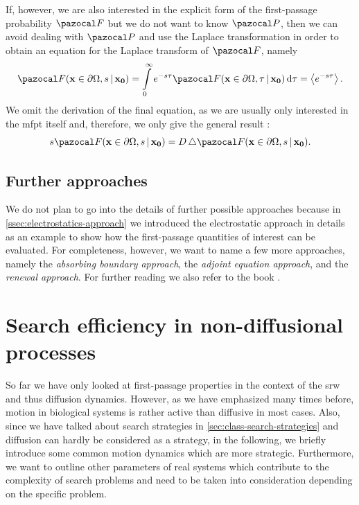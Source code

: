 \noindent If, however, we are also interested in the explicit form of the first-passage probability $\F$ but we do not want to know $\P$, then we can avoid dealing with $\P$ and use the Laplace transformation in order to obtain an equation for the Laplace transform of $\F$, namely
\begin{equation*}
 \F(\bv{x} \in \partial \Omega, s \,|\, \bv{x_0}) = \int\limits_0^\infty e^{-s\tau} \F(\bv{x} \in \partial \Omega, \tau \,|\, \bv{x_0}) \diff \tau = \avg{e^{-s\tau}}.
\end{equation*}
We omit the derivation of the final equation, as we are usually only interested in the \ac{mfpt} itself and, therefore, we only give the general result \cite{krapivsky:2010}:
\begin{equation}
 s \F(\bv{x} \in \partial \Omega, s \,|\, \bv{x_0}) = D \Laplace \F(\bv{x} \in \partial \Omega, s \,|\, \bv{x_0}).
\end{equation}

\subsection{Further approaches}
We do not plan to go into the details of further possible approaches because in \autoref{ssec:electrostatics-approach} we introduced the electrostatic approach in details as an example to show how the first-passage quantities of interest can be evaluated. For completeness, however, we want to name a few more approaches, namely the \textit{absorbing boundary approach}, the \textit{adjoint equation approach}, and the \textit{renewal approach}. For further reading we also refer to the book .

\section{Search efficiency in non-diffusional processes}

\bigskip

\noindent So far we have only looked at first-passage properties in the context of the \ac{srw} and thus diffusion dynamics. However, as we have emphasized many times before, motion in biological systems is rather active than diffusive in most cases. Also, since we have talked about search strategies in \autoref{sec:class-search-strategies} and diffusion can hardly be considered as a strategy, in the following, we briefly introduce some common motion dynamics which are more strategic. Furthermore, we want to outline other parameters of real systems which contribute to the complexity of search problems and need to be taken into consideration depending on the specific problem.

